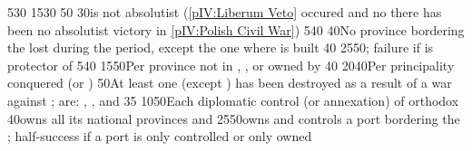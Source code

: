 %
%
%
{5}{30}{\EU@objBaltiqueTrade}%
%
{15}{30}{\EU@objNoRUSBaltique}%
%
{}{50}{\EU@objDMB}%
%
{}{30}{\paysmajeurPologne is not absolutist (\ref{pIV:Liberum Veto} occured
  and no there has been no absolutist victory in \ref{pIV:Polish Civil War})}%
% 
%
%
{5}{40}{\EU@objBaltiqueTrade}%
{}{40}{No province bordering the \regionBaltique lost during the period,
  except the one where  is built}%
%
{}{40}{\EU@objDMB}%
%
{25}{50}{\EU@objPOLVictoryText; failure if \paysmajeurFrance is protector of
  \paysPologne}%
%
%
%
{5}{40}{\EU@objBaltiqueTrade}%
%
%
{15}{50}{Per province not in \regionNorvege, \regionDanemark, \regionFinlande
  or \regionSuede owned by \paysmajeurSuede}%
%
{}{40}{}%
%
%
%
%
{20}{40}{Per principality conquered (\payspskov or \paysryazan)}%
%
%
%
{}{50}{At least one  (except \paysSteppes) has been destroyed
  as a result of a war against \paysmajeurRussie;  are:
  \paysKazan, \paysAstrakhan, \paysCrimee and \paysCosaquesdon}%
%
{}{35}{}%
%
%
%
{10}{50}{Each diplomatic control (or annexation) of orthodox \MIN}%
%
{}{40}{\paysmajeurRussie owns all its national provinces and
  \provinceSmolenska}%
%
{25}{50}{\paysmajeurRussie owns and controls a port bordering the
  \regionBaltique; half-success if a port is only controlled or only owned}%
